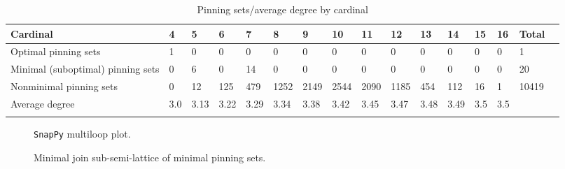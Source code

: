 \documentclass{article}%
\begin{document}
\begin{table}[ht]
	\caption{Pinning sets/average degree by cardinal}
	\centering
	\renewcommand{\arraystretch}{1.5}
	\begin{tabularx}{\textwidth}{lXXXXXXXXXXXXXXX}
		\toprule
			Cardinal & 4 & 5 & 6 & 7 & 8 & 9 & 10 & 11 & 12 & 13 & 14 & 15 & 16 & Total\\
			\hline
			Optimal pinning sets & 1 & 0 & 0 & 0 & 0 & 0 & 0 & 0 & 0 & 0 & 0 & 0 & 0 & 1 \\
			Minimal (suboptimal) pinning sets & 0 & 6 & 0 & 14 & 0 & 0 & 0 & 0 & 0 & 0 & 0 & 0 & 0 & 20 \\
			Nonminimal pinning sets & 0 & 12 & 125 & 479 & 1252 & 2149 & 2544 & 2090 & 1185 & 454 & 112 & 16 & 1 & 10419 \\
			Average degree & 3.0 & 3.13 & 3.22 & 3.29 & 3.34 & 3.38 & 3.42 & 3.45 & 3.47 & 3.48 & 3.49 & 3.5 & 3.5 &  \\
		\bottomrule \\ 
	\end{tabularx}
\end{table}

\begin{multicols}{2}
\begin{figure}[H]
\centering

\caption{\texttt{SnapPy} multiloop plot.}
\label{fig:tex/img/[[24, 19, 1, 20], [20, 6, 21, 5], [14, 23, 15, 24], [18, 28, 19, 25], [1, 7, 2, 6], [21, 12, 22, 13], [13, 4, 14, 5], [22, 3, 23, 4], [15, 11, 16, 10], [25, 10, 26, 9], [17, 8, 18, 9], [27, 7, 28, 8],.svg}
\end{figure}
\columnbreak

\begin{figure}[H]
\centering
\scalebox{0.8}{}
\caption{Minimal join sub-semi-lattice of minimal pinning sets.}
\label{fig:tex/img/[[24, 19, 1, 20], [20, 6, 21, 5], [14, 23, 15, 24], [18, 28, 19, 25], [1, 7, 2, 6], [21, 12, 22, 13], [13, 4, 14, 5], [22, 3, 23, 4], [15, 11, 16, 10], [25, 10, 26, 9], [17, 8, 18, 9], [27, 7, 28, 8],.pgf}
\end{figure}
\end{multicols}

\newpage
\end{document}
